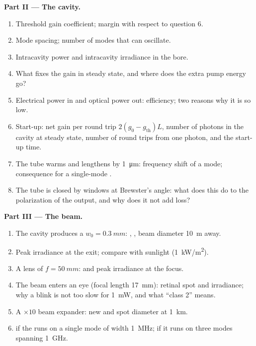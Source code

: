 \begin{problem}
\textbf{Part II --- The cavity.}
\begin{enumerate}[resume]
  \item Threshold gain coefficient; margin with respect to question 6.
  \item Mode spacing; number of modes that can oscillate.
  \item Intracavity power and intracavity irradiance in the bore.
  \item What fixes the gain in steady state, and where does the extra
        pump energy go?
  \item Electrical power in and optical power out: efficiency; two
        reasons why it is so low.
  \item Start-up: net gain per round trip $2(g_0 - g_{\text{th}})L$,
        number of photons in the cavity at steady state, number of
        round trips from one photon, and the start-up time.
  \item The tube warms and lengthens by \qty{1}{\micro m}: frequency
        shift of a mode; consequence for a single-mode .
  \item The tube is closed by windows at Brewster's angle: what does
        this do to the polarization of the output, and why does it not
        add loss?
\end{enumerate}

\textbf{Part III --- The beam.}
\begin{enumerate}[resume]
  \item The cavity produces a  $w_0 = \qty{0.3}{mm}$: , , beam diameter \qty{10}{m} away.
  \item Peak irradiance at the exit; compare with sunlight
        (\qty{1}{kW/m^2}).
  \item A lens of $f = \qty{50}{mm}$:  and peak irradiance at the
        focus.
  \item The beam enters an eye (focal length \qty{17}{mm}): retinal spot
        and irradiance; why a blink is not too slow for \qty{1}{mW},
        and what ``class 2'' means.
  \item A $\times 10$ beam expander: new  and spot diameter
        at \qty{1}{km}.
  \item {} if the  runs on a single mode of width
        \qty{1}{MHz}; if it runs on three modes spanning \qty{1}{GHz}.
\end{enumerate}


\end{problem}
